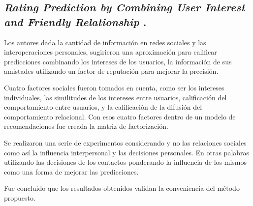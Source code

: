 \subsection{
    \textbf{\emph{Rating Prediction by Combining User Interest
            and Friendly Relationship}
    }
    \cite[pág. 167]{somani_emerging_2019}.
}

Los autores dada la cantidad de información en redes sociales y las interoperaciones personales, sugirieron una aproximación para calificar predicciones combinando los intereses de los usuarios, la información de sus amistades
utilizando un factor de reputación para mejorar la precisión.\par

Cuatro factores sociales fueron tomados en cuenta, como ser los intereses individuales,
las similitudes de los intereses entre usuarios, calificación del comportamiento entre usuarios,
y la calificación de la difusión del comportamiento relacional. Con esos cuatro factores dentro
de un modelo de recomendaciones fue creada la matriz de factorización.\par

Se realizaron una serie de experimentos considerando y no las relaciones sociales
como así la influencia interpersonal y las decisiones personales.
En otras palabras utilizando las decisiones de los contactos ponderando
la influencia de los mismos como una forma de mejorar las predicciones.\par

Fue concluido que los resultados obtenidos validan la conveniencia del método propuesto.\par
